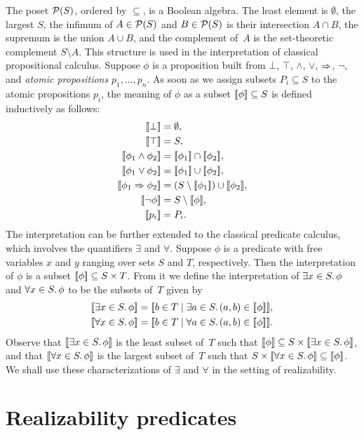The poset $\mathcal{P}(S)$, ordered by $\subseteq$, is a Boolean algebra. The
least element is $\emptyset$, the largest $S$, the infimum of $A \in
\mathcal{P}(S)$ and $B \in \mathcal{P}(S)$ is their intersection $A \cap B$, the
supremum is the union $A \cup B$, and the complement of~$A$ is the
set-theoretic complement $S \setminus A$. This structure is used in
the interpretation of classical propositional calculus. Suppose $\phi$
is a proposition built from $\bot$, $\top$, $\land$, $\lor$,
$\Rightarrow$, $\lnot$, and \emph{atomic propositions} $p_1, \ldots,
p_n$. As soon as we assign subsets $P_i \subseteq S$ to the atomic
propositions $p_i$, the meaning of $\phi$ as a subset $[\![\phi]\!]
\subseteq S$ is defined inductively as follows:
%
\begin{align*}
  \sem{\bot} &= \emptyset,\\
  \sem{\top} &= S,\\
  \sem{\phi_1 \land \phi_2} &= \sem{\phi_1} \cap \sem{\phi_2},\\
  \sem{\phi_1 \lor \phi_2} &= \sem{\phi_1} \cup \sem{\phi_2},\\
  \sem{\phi_1 \lthen \phi_2} &= (S \setminus \sem{\phi_1}) \cup \sem{\phi_2},\\
  \sem{\lnot \phi} &= S \setminus \sem{\phi},\\
  \sem{p_i} &= P_i.
\end{align*}
%
The interpretation can be further extended to the classical predicate
calculus, which involves the quantifiers $\exists$ and $\forall$.
Suppose $\phi$ is a predicate with free variables $x$ and $y$ ranging
over sets $S$ and $T$, respectively. Then the interpretation of $\phi$
is a subset $[\![\phi]\!] \subseteq S \times T$. From it we define the
interpretation of $\exists x \in S .\,{\phi}$ and $\forall x \in S .\,{\phi}$ to be
the subsets of~$T$ given by
%
\begin{align*}
  \sem{\some{x \in S}{\phi}} &=
  \sem{b \in T \such \some{a \in S}{(a,b) \in \sem{\phi}}}, \\
  \sem{\all{x \in S}{\phi}} &=
  \sem{b \in T \such \all{a \in S}{(a,b) \in \sem{\phi}}}.
\end{align*}
%
Observe that $[\![\exists x \in S .\,{\phi}]\!]$ is the least subset of~$T$
such that $[\![\phi]\!] \subseteq S \times [\![\exists x \in S .\,{\phi}]\!]$,
and that $[\![\forall x \in S .\,{\phi}]\!]$ is the largest subset of~$T$ such
that $S \times [\![\forall x \in S .\,{\phi}]\!] \subseteq [\![\phi]\!]$. We shall
use these characterizations of $\exists$ and $\forall$ in the setting
of realizability.

\section{Realizability predicates}
\label{sec:realizability-predicates}


